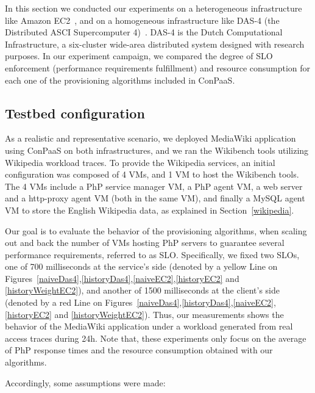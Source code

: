 In this section we conducted our experiments on a heterogeneous infrastructure like Amazon EC2~\cite{amazonEC2}, and on a homogeneous infrastructure like DAS-4 (the Distributed ASCI Supercomputer 4)~\cite{das4}. DAS-4 is the Dutch Computational Infrastructure, a six-cluster wide-area distributed system designed with research purposes. In our experiment campaign, we compared the degree of SLO enforcement (performance requirements fulfillment) and resource consumption for each one of the provisioning algorithms included in ConPaaS. 


\subsection{Testbed configuration}

As a realistic and representative scenario, we deployed MediaWiki application using ConPaaS on both infrastructures, and we ran the Wikibench tools utilizing Wikipedia workload traces.  To provide the Wikipedia services, an initial configuration was composed of 4 VMs, and 1 VM to host the Wikibench tools. The 4 VMs include a PhP service manager VM, a PhP agent VM, a web server and a http-proxy agent VM (both in the same VM), and finally a MySQL agent VM to store the English Wikipedia data, as explained in Section~\ref{wikipedia}.

Our goal is to evaluate the behavior of the provisioning algorithms, when scaling out and back the number of VMs hosting PhP servers to guarantee several performance requirements, referred to as SLO. Specifically, we fixed two SLOs, one of 700 milliseconds at the service's side (denoted by a yellow Line on Figures~\ref{naiveDas4},\ref{historyDas4},\ref{naiveEC2},\ref{historyEC2} and \ref{historyWeightEC2}), and another of 1500 milliseconds at the client's side (denoted by a red Line on Figures~\ref{naiveDas4},\ref{historyDas4},\ref{naiveEC2},\ref{historyEC2} and \ref{historyWeightEC2}). Thus, our measurements shows the behavior of the MediaWiki application under a workload generated from real access traces during 24h. Note that, these experiments only focus on the average of PhP response times and the resource consumption obtained with our algorithms. 

\noindent Accordingly, some assumptions were made:

